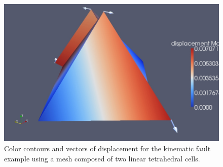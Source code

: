 \begin{figure}
\begin{centering}
\includegraphics[scale=0.33]{tutorials/twocells/figs/twotet4-dislocation}
\par\end{centering}

\caption{Color contours and vectors of displacement for the kinematic fault
example using a mesh composed of two linear tetrahedral cells.\label{fig:twotet4-disloc}}
\end{figure}

